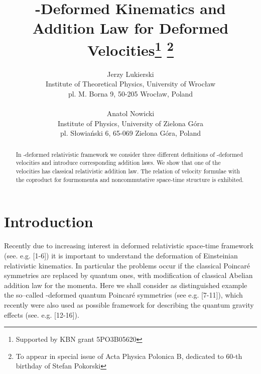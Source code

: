 \documentclass[a4paper,12pt]{article}
\begin{document}
\title{\myHighlight{$\kappa$}\coordHE{}-Deformed Kinematics and Addition Law
for Deformed Velocities\thanks{Supported by KBN grant
5PO3B05620}
\thanks{To appear in special issue of Acta Physica
Polonica B, dedicated to 60-th birthday of Stefan Pokorski}}
\author{Jerzy Lukierski\\
Institute of Theoretical Physics, University of Wroc\l aw \\ pl. M. Borna 9,
50-205 Wroc\l aw, Poland
\\ \\
Anatol Nowicki \\ Institute of Physics, University of Zielona
G\'{o}ra\\ pl. S\l owia\'{n}ski 6, 65-069 Zielona G\'{o}ra,
Poland}

\maketitle
\begin{abstract}
In \myHighlight{$\kappa$}\coordHE{}-deformed relativistic framework we consider three
different definitions of \myHighlight{$\kappa$}\coordHE{}-deformed  velocities  and
introduce corresponding addition laws. We show that one of the
velocities has classical relativistic addition law. The relation
of velocity formulae with the coproduct  for fourmomenta and
noncommutative space-time structure is exhibited.
\end{abstract}

\section{Introduction}
Recently due to increasing interest in deformed relativistic space-time
framework (see. e.g. [1-6]) it is important to understand the deformation of
Einsteinian relativistic kinematics. In particular the problems occur if the
classical Poincar\'{e} symmetries are replaced by quantum ones, with
modification of classical Abelian addition law for the momenta. Here we shall
consider as distinguished example the so--called \myHighlight{$\kappa$}\coordHE{}-deformed quantum
Poincar\'{e} symmetries (see e.g. [7-11]), which recently were also used as
possible framework for describing the quantum gravity effects (see. e.g.
[12-16]).
\end{document}
